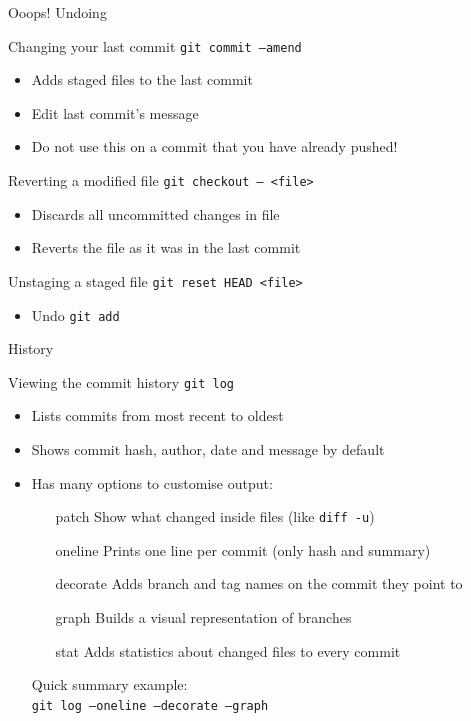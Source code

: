 \documentclass{beamer}
\begin{document}
\begin{frame}{Ooops! Undoing}
  \begin{block}{Changing your last commit}
    \texttt{git commit --amend}
    \begin{itemize}
    \item Adds staged files to the \alert{last} commit
    \item Edit \alert{last} commit's message
    \item Do not use this on a commit that you have already pushed!
    \end{itemize}
  \end{block}
  \begin{block}{Reverting a modified file}
    \texttt{git checkout -- <file>}
    \begin{itemize}
    \item Discards all uncommitted changes in file
    \item Reverts the file as it was in the last commit
    \end{itemize}
  \end{block}
  \begin{block}{Unstaging a staged file}
    \texttt{git reset HEAD <file>}
    \begin{itemize}
    \item Undo \texttt{git add}
    \end{itemize}
  \end{block}
\end{frame}

\begin{frame}{History}
  \begin{block}{Viewing the commit history}
    \texttt{git log}
    \begin{itemize}
    \item Lists commits from most recent to oldest
    \item Shows commit hash, author, date and message by default
    \item Has many options to customise output:
      \begin{itemize}
      \item[patch] Show what changed inside files (like \texttt{diff -u})
      \item[oneline] Prints one line per commit (only hash and summary)
      \item[decorate] Adds branch and tag names on the commit they point to
      \item[graph] Builds a visual representation of branches
      \item[stat] Adds statistics about changed files to every commit
      \end{itemize}
      Quick summary example:\\\texttt{git log --oneline --decorate --graph}
    \end{itemize}
  \end{block}
\end{frame}
\end{document}
